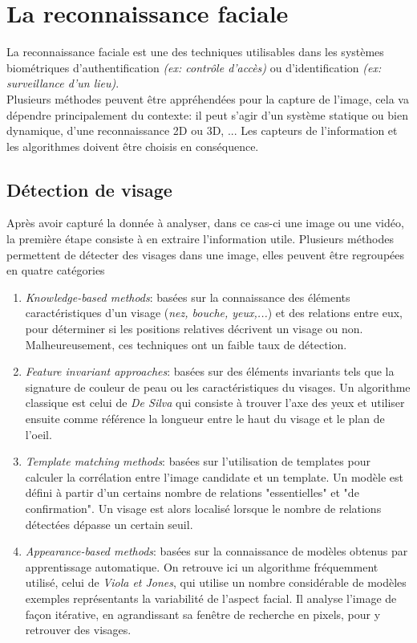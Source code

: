 \section{La reconnaissance faciale}
La reconnaissance faciale est une des techniques utilisables dans les systèmes biométriques d'authentification \textit{(ex: contrôle d'accès)} ou d'identification \textit{(ex: surveillance d'un lieu)}.
\\
Plusieurs méthodes peuvent être appréhendées pour la capture de l'image, cela va dépendre principalement du contexte: il peut s'agir d'un système statique ou bien dynamique, d'une reconnaissance 2D ou 3D, ... Les capteurs de l'information et les algorithmes doivent être choisis en conséquence.

\subsection{Détection de visage}
Après avoir capturé la donnée à analyser, dans ce cas-ci une image ou une vidéo, la première étape consiste à en extraire l'information utile. Plusieurs méthodes permettent de détecter des visages dans une image, elles peuvent être regroupées en quatre catégories \cite{Xthesis_1}
\begin{enumerate}
\item \textit{Knowledge-based methods}: basées sur la connaissance des éléments caractéristiques d'un visage (\textit{nez, bouche, yeux,...}) et des relations entre eux, pour déterminer si les positions relatives décrivent un visage ou non. Malheureusement, ces techniques ont un faible taux de détection.
\item \textit{Feature invariant approaches}: basées sur des éléments invariants tels que la signature de couleur de peau ou les caractéristiques du visages. Un algorithme classique est celui de \textit{De Silva} qui consiste à trouver l'axe des yeux et utiliser ensuite comme référence la longueur entre le haut du visage et le plan de l'oeil.
\item \textit{Template matching methods}: basées sur l'utilisation de templates pour calculer la corrélation entre l'image candidate et un template. Un modèle est défini à partir d'un certains nombre de relations "essentielles" et "de confirmation". Un visage est alors localisé lorsque le nombre de relations détectées dépasse un certain seuil.
\item \textit{Appearance-based methods}: basées sur la connaissance de modèles obtenus par apprentissage automatique. On retrouve ici un algorithme fréquemment utilisé, celui de \textit{Viola et Jones}, qui utilise un nombre considérable de modèles exemples représentants la variabilité de l'aspect facial. Il analyse l'image de façon itérative, en agrandissant sa fenêtre de recherche en pixels, pour y retrouver des visages.
\end{enumerate}
